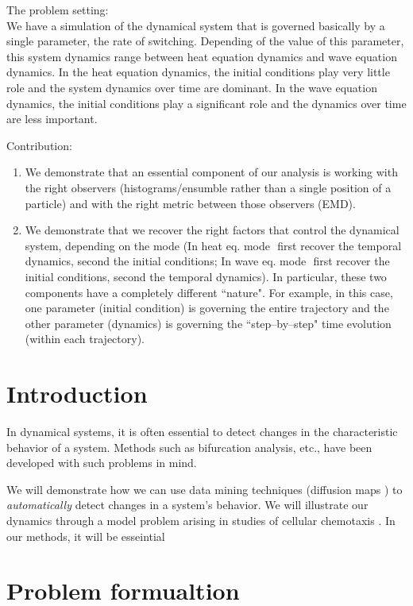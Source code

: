 \documentclass[prl,preprint]{revtex4-1}
\begin{document}
The problem setting:\\
 We have a simulation of the dynamical system that is governed basically by a single parameter,­ the rate of switching.
 Depending of the value of this parameter, this system dynamics range between heat equation dynamics and wave equation dynamics. 
 In the heat equation dynamics, the initial conditions play very little role and the system dynamics over time are dominant. 
 In the wave equation dynamics, the initial conditions play a significant role and the dynamics over time are less important.


Contribution: 
\begin{enumerate}
\item We demonstrate that an essential component of our analysis is working with the right observers (histograms/ensumble rather than a single position of a particle) and with the right metric between those observers (EMD).
%
\item We demonstrate that we recover the right factors that control the dynamical system, depending on the mode (In heat eq. mode ­ first recover the temporal dynamics, second the initial conditions; In wave eq. mode ­ first recover the initial conditions, second the temporal dynamics). In particular, these two components have a completely different ``nature". For example, in this case, one parameter (initial condition) is governing the entire trajectory and the other parameter (dynamics) is governing the ``step­--by­--step" time evolution (within each trajectory).
\end{enumerate}

\section{Introduction}

In dynamical systems, it is often essential to detect changes in the characteristic behavior of a system.
%
Methods such as bifurcation analysis, etc., have been developed with such problems in mind. 

We will demonstrate how we can use data mining techniques (diffusion maps \cite{...}) to {\em automatically} detect changes in a system's behavior.
%
We will illustrate our dynamics through a model problem arising in studies of cellular chemotaxis \cite{...}.
%
In our methods, it will be esseintial 


\section{Problem formualtion}
\end{document}
